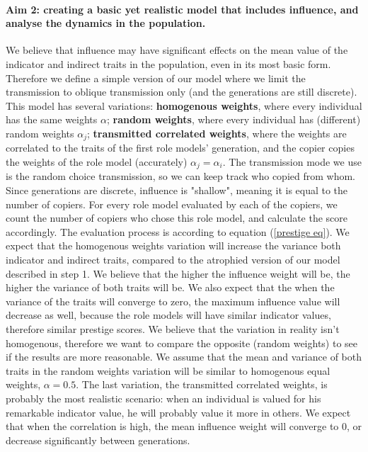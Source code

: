 \documentclass[11pt]{article}
\begin{document}
 \paragraph*{Aim 2: creating a basic yet realistic model that includes influence, and analyse the dynamics in the population.}\label{basic model}
 We believe that influence may have significant effects on the mean value of the indicator and indirect traits in the population, even in its most basic form.
  Therefore we define a simple version of our model where we limit the transmission to oblique transmission only (and the generations are still discrete). %
  This model has several variations: \textbf{homogenous weights}, where every individual has the same weights $\alpha$; %
   \textbf{random weights}, where every individual has (different) random weights $\alpha_j$;
    \textbf{transmitted correlated weights}, where the weights are correlated to the traits of the first role models' generation, and the copier copies the weights of the role model (accurately) $\alpha_j = \alpha_i$. %
  The transmission mode we use is the random choice transmission, so we can keep track who copied from whom. %
  Since generations are discrete, influence is "shallow", meaning it is equal to the number of copiers. %
  For every role model evaluated by each of the copiers, we count the number of copiers who chose this role model, and calculate the score accordingly. %
  The evaluation process is according to equation (\ref{prestige eq}). %
  We expect that the homogenous weights variation will increase the variance both indicator and indirect traits, compared to the atrophied version of our model described in step 1.
  We believe that the higher the influence weight will be, the higher the variance of both traits will be.
  We also expect that the when the variance of the traits will converge to zero, the maximum influence value will decrease as well, because the role models will have similar indicator values, therefore similar prestige scores.
    We believe that the variation in reality isn't homogenous, therefore we want to compare the opposite (random weights) to see if the results are more reasonable.
  We assume that the mean and variance of both traits in the random weights variation will be similar to homogenous equal weights, $\alpha=0.5$.
  The last variation, the transmitted correlated weights, is probably the most realistic scenario: when an individual is valued for his remarkable indicator value, he will probably value it more in others.
  We expect that when the correlation is high, the mean influence weight will converge to 0, or decrease significantly between generations.\\
  
\end{document}
